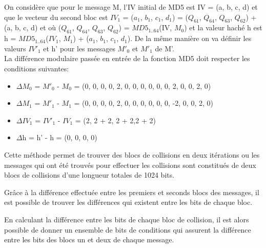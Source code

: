 On considère que pour le message M, l'IV initial de MD5 est IV = (a, b, c, d) et que le vecteur du second bloc est $IV_{1}$ = ($a_{1}$, $b_{1}$, $c_{1}$, $d_{1}$) = ($Q_{61}$, $Q_{64}$, $Q_{63}$, $Q_{62}$) + (a, b, c, d) et où ($Q_{61}$, $Q_{64}$, $Q_{63}$, $Q_{62}$) = $MD5_{1..64}$(IV, $M_{0}$) et la valeur haché h est h = $MD5_{1..64}$($IV_{1}$, $M_{1}$) + ($a_{1}$, $b_{1}$, $c_{1}$, $d_{1}$). De la même manière on va définir les valeurs $IV'_{1}$ et h' pour les messages $M'_{0}$ et $M'_{1}$ de M'.\\

La différence modulaire passée en entrée de la fonction MD5 doit respecter les conditions suivantes:
\begin{itemize}
\item $\Delta$$M_{0}$ = $M'_{0}$ - $M_{0}$ = (0, 0, 0, 0, 2, 0, 0, 0, 0, 0, 0, 2, 0, 0, 2, 0)
\item $\Delta$$M_{1}$ = $M'_{1}$ - $M_{1}$ = (0, 0, 0, 0, 2, 0, 0, 0, 0, 0, 0, -2, 0, 0, 2, 0)
\item $\Delta$$IV_{1}$ = $IV'_{1}$ - $IV_{1}$ = (2, 2 + 2, 2 + 2,2 + 2)
\item $\Delta$h = h' - h = (0, 0, 0, 0)
\end{itemize}
\vspace{.5cm}

Cette méthode permet de trouver des blocs de collisions en deux itérations ou les messages qui ont été trouvés pour effectuer les collisions sont constitués de deux blocs de collisions d'une longueur totales de 1024 bits.

Grâce à la différence effectuée entre les premiers et seconds blocs des messages, il est possible de trouver les différences qui existent entre les bits de chaque bloc.

En calculant la différence entre les bits de chaque bloc de collision, il est alors possible de donner un ensemble de bits de conditions qui assurent la différence entre les bits des blocs un et deux de chaque message.



